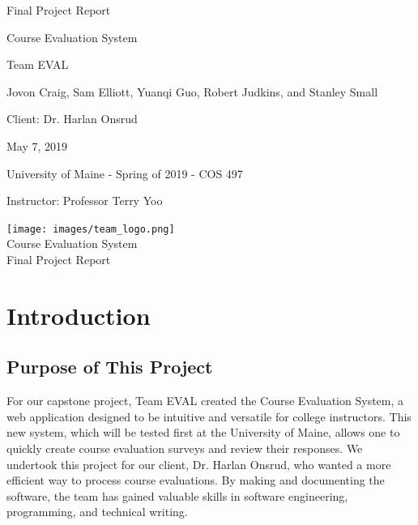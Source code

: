 \documentclass{article}
\begin{document}
\begin{titlepage}


\centering
\vspace*{2cm}
{\Huge Final Project Report\par}
\vspace{.25cm}
{\LARGE Course Evaluation System\par}
\vspace{1cm}
{\Large Team EVAL\par}
\vspace{.2cm}
{\Large Jovon Craig, Sam Elliott, Yuanqi Guo, Robert Judkins, and Stanley Small\par}
\vspace{1cm}
{\Large Client: Dr. Harlan Onsrud\par}
\vspace{1cm}
{\Large May 7, 2019\par}
\vspace{11cm}

University of Maine - Spring of 2019 - COS 497

Instructor: Professor Terry Yoo

\end{titlepage}

\newpage

\begin{center}
{\texttt{[image: images/team\_logo.png]}} \\ 	\bigskip
{\LARGE Course Evaluation System } \\ \medskip
{\large Final Project Report } \\ \medskip
\end{center}

\tableofcontents

\newpage

\section{Introduction}

\subsection{Purpose of This Project}

For our capstone project, Team EVAL created the Course Evaluation System, a web application designed to be intuitive and versatile for college instructors. This new system, which will be tested first at the University of Maine, allows one to quickly create course evaluation surveys and review their responses. We undertook this project for our client, Dr. Harlan Onsrud, who wanted a more efficient way to process course evaluations. By making and documenting the software, the team has gained valuable skills in software engineering, programming, and technical writing.
\end{document}
